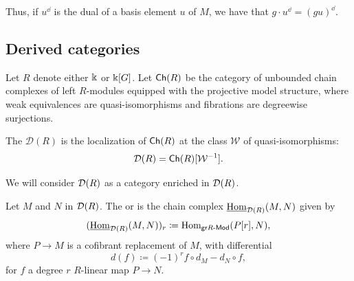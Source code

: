 Thus, if \(u^\dd\) is the dual of a basis element \(u\) of \(M\), we have that \(g \cdot u^\dd = (gu)^\dd\).

%
%
%

\subsection{Derived categories}\label{Pderived}

Let \(R\) denote either \(\Bbbk\) or \(\Bbbk[G]\).
Let \(\mathsf{Ch}(R)\) be the category of unbounded chain complexes of left \(R\)-modules equipped with the projective model structure, where weak equivalences are quasi-isomorphisms and fibrations are degreewise surjections.

\begin{definition}
	The  \(\mathcal D(R)\) is the localization of \(\mathsf{Ch}(R)\) at the class \(\mathcal W\) of quasi-isomorphisms:
	\[
	\mathcal D(R) = \mathsf{Ch}(R)[\mathcal W^{-1}].
	\]
\end{definition}

We will consider \(\mathcal{D}(R)\) as a category enriched in \(\mathcal{D}(R)\). %

\begin{definition}
	Let \(M\) and \(N\) in \(\mathcal{D}(R)\). The  or  is the chain complex \(\underline{\mathrm{Hom}}_{\mathcal{D}(R)}(M, N)\) given by
	\[
	(\underline{\mathrm{Hom}}_{\mathcal{D}(R)}(M, N))_r \coloneqq \mathrm{Hom}_{\mathsf{gr} R\text{-}\mathsf{Mod}}(P[r], N),
	\]
	where \(P \to M\) is a cofibrant replacement of \(M\), with differential
	\[
	d (f) \coloneqq (-1)^r f \circ d_M - d_N \circ f,
	\]
	for \(f\) a degree \(r\) \(R\)-linear map \(P \to N\).
\end{definition}

